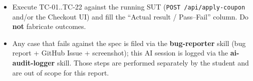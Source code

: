 \documentclass[11pt,a4paper]{article}
\newcommand{\code}[1]{\texttt{#1}}
\begin{document}
\begin{itemize}[nosep]
  \item Execute TC-01..TC-22 against the running SUT (\code{POST /api/apply-coupon}
        and/or the Checkout UI) and fill the ``Actual result / Pass--Fail'' column.
        Do \textbf{not} fabricate outcomes.
  \item Any case that fails against the spec is filed via the \textbf{bug-reporter}
        skill (bug report + GitHub Issue + screenshot); this AI session is logged via
        the \textbf{ai-audit-logger} skill. Those steps are performed separately by
        the student and are out of scope for this report.
\end{itemize}
\end{document}
